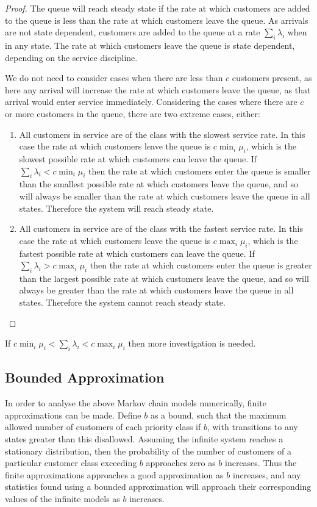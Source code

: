 \documentclass{article}
\begin{document}
\begin{proof}
The queue will reach steady state if the rate at which customers are added to
the queue is less than the rate at which customers leave the queue.
As arrivals are not state dependent, customers are added to the queue at a rate
$\sum_i \lambda_i$ when in any state.
The rate at which customers leave the queue is state dependent, depending on the
service discipline.

We do not need to consider cases when there are less than $c$ customers present,
as here any arrival will increase the rate at which customers leave the queue,
as that arrival would enter service immediately.
Considering the cases where there are $c$ or more customers in the queue, there
are two extreme cases, either:

\begin{enumerate}
  \item All customers in service are of the class with the slowest service rate.
  In this case the rate at which customers leave the queue is $c \min_i \mu_i$,
  which is the slowest possible rate at which customers can leave the queue.
  If $\sum_i \lambda_i < c \min_i \mu_i$ then the rate at which customers enter
  the queue is smaller than the smallest possible rate at which customers leave
  the queue, and so will always be smaller than the rate at which customers
  leave the queue in all states. Therefore the system will reach steady state.
  \item All customers in service are of the class with the fastest service rate.
  In this case the rate at which customers leave the queue is $c \max_i \mu_i$,
  which is the fastest possible rate at which customers can leave the queue.
  If $\sum_i \lambda_i > c \max_i \mu_i$ then the rate at which customers enter
  the queue is greater than the largest possible rate at which customers leave
  the queue, and so will always be greater than the rate at which customers
  leave the queue in all states. Therefore the system cannot reach steady state.
\end{enumerate}
\end{proof}

If $c \min_i \mu_i < \sum_i \lambda_i < c \max_i \mu_i$ then more investigation
is needed.



\subsection{Bounded Approximation}\label{sec:bound}
In order to analyse the above Markov chain models numerically, finite
approximations can be made. Define $b$ as a bound, such that the maximum allowed
number of customers of each priority class if $b$, with transitions to any
states greater than this disallowed.
Assuming the infinite system reaches a stationary distribution, then the
probability of the number of customers of a particular customer class exceeding
$b$ approaches zero as $b$ increases. Thus the finite approximations approaches
a good approximation as $b$ increases, and any statistics found using a bounded
approximation will approach their corresponding values of the infinite models as
$b$ increases.
\end{document}
